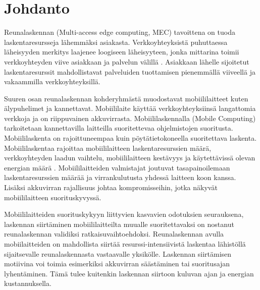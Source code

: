 
\section{Johdanto}
Reunalaskennan (Multi-access edge computing, MEC) tavoittena on tuoda laskentaresursseja lähemmäksi asiakasta.
Verkkoyhteyksistä puhuttaessa läheisyyden merkitys laajenee loogiseen läheisyyteen, jonka mittarina toimii verkkoyhteyden viive asiakkaan ja palvelun välillä \cite{satyanarayanan2017emergence}.
Asiakkaan lähelle sijoitetut laskentaresurssit mahdollistavat palveluiden tuottamisen pienemmällä viiveellä ja vakaammilla verkkoyhteyksillä.



Suuren osan reunalaskennan kohderyhmästä muodostavat mobiililaitteet kuten älypuhelimet ja kannettavat. 
Mobiililaite käyttää verkkoyhteyksiinsä langattomia verkkoja ja on riippuvainen akkuvirrasta.
Mobiililaskennalla (Mobile Computing) tarkoitetaan kannettavilla laitteilla suoritettevaa ohjelmistojen suoritusta. 
Mobiililaskenta on rajoittuneempaa kuin pöytätietokoneella suoritettava laskenta. Mobiililaskentaa rajoittaa mobiililaitteen laskentaresurssien määrä, verkkoyhteyden laadun vaihtelu, mobiililaitteen kestävyys ja käytettävissä olevan energian määrä \cite{satya96}. 
Mobiililaitteiden valmistajat joutuvat tasapainoilemaan laskentaresurssien määrää ja virrankulutusta yhdessä laitteen koon kanssa. Lisäksi akkuvirran rajallisuus johtaa kompromisseihin, jotka näkyvät mobiililaitteen suorituskyvyssä\cite{satya01pervasive}.

Mobiililaitteiden suorituskykyyn liittyvien kasvavien odotuksien seurauksena, laskennan siirtäminen mobiililaitteilta muualle suoritettavaksi on nostanut reunalaskennan validiksi ratkaisuvaihtoehdoksi. Reunalaskennan avulla mobiilaitteiden on mahdollista siirtää resurssi-intensiivistä laskentaa lähistöllä sijaitsevalle reunalaskennasta vastaavalle yksikölle. 
Laskennan siirtämisen motiivina voi toimia esimerkiksi akkuvirran säästäminen tai suoritusajan lyhentäminen. Tämä tulee kuitenkin laskennan siirtoon kuluvan ajan ja energian kustannuksella. 

